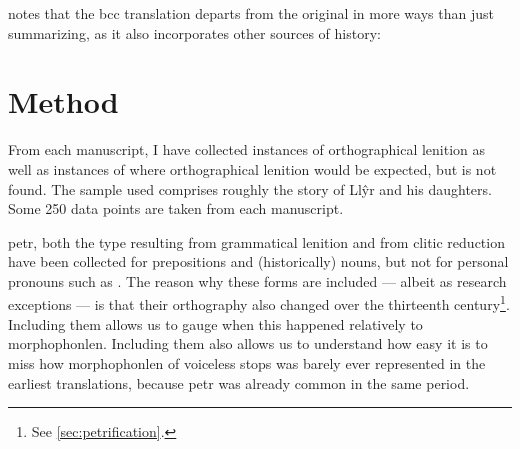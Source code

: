 \Textcite{bowen_testunau_1974} notes that the \gls{bcc} translation departs from the original in more ways than just summarizing, as it also incorporates other sources of history:


\section{Method}
\label{sec:method}
From each manuscript, I have collected instances of orthographical
lenition as well as instances of where orthographical lenition would
be expected, but is not found. The sample used comprises roughly the
story of Llŷr and his daughters.  Some 250 data points are taken
from each manuscript.

\Gls{petr}, both the type resulting from grammatical lenition and from clitic reduction have been collected for prepositions
and (historically) nouns, but not for personal pronouns such
as . The reason why these forms are included --- albeit
as research exceptions --- is that their orthography also changed over the
thirteenth century\footnote{See \ref{sec:petrification}.}. Including them allows
us to gauge when this happened relatively to \gls{morphophonlen}.
Including them also allows us to understand how easy it is to miss how \gls{morphophonlen} of voiceless stops was barely ever represented in the earliest translations, because \gls{petr} was already common in the same period.

